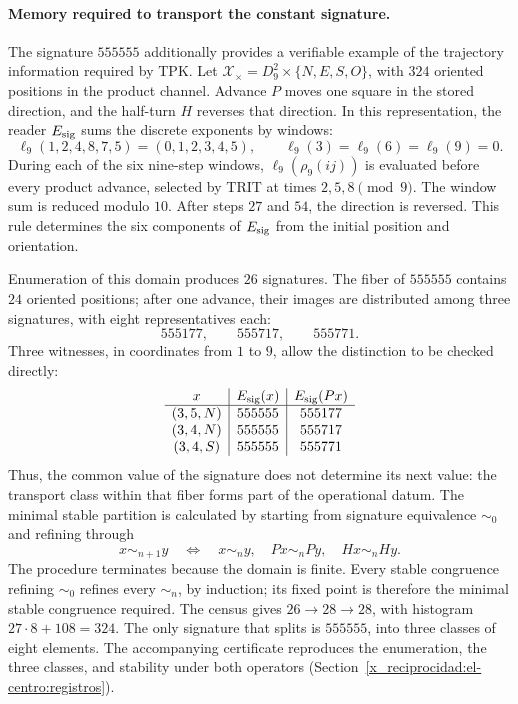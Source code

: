 \paragraph{Memory required to transport the constant signature.}
The signature \(555555\) additionally provides a verifiable example of
the trajectory information required by TPK. Let
\(\mathcal X_\times=D_9^2\times\{N,E,S,O\}\), with \(324\)
oriented positions in the product channel. Advance \(P\) moves
one square in the stored direction, and the half-turn \(H\)
reverses that direction. In this representation, the reader
\(E_{\rm sig}\) sums the discrete exponents by windows:
\[
 \ell_9(1,2,4,8,7,5)=(0,1,2,3,4,5),\qquad
 \ell_9(3)=\ell_9(6)=\ell_9(9)=0.
\]
During each of the six nine-step windows,
\(\ell_9(\rho_9(ij))\) is evaluated before every product advance, selected
by TRIT at times \(2,5,8\pmod9\). The window sum is
reduced modulo \(10\). After steps \(27\) and \(54\), the
direction is reversed. This rule determines the six components of
\(E_{\rm sig}\) from the initial position and orientation.

Enumeration of this domain produces \(26\) signatures. The fiber of
\(555555\) contains \(24\) oriented positions; after one
advance, their images are distributed among three signatures, with eight
representatives each:
\[
 555177,\qquad555717,\qquad555771.
\]
Three witnesses, in coordinates from \(1\) to \(9\), allow the
distinction to be checked directly:
\[
\begin{array}{c|c|c}
x&E_{\rm sig}(x)&E_{\rm sig}(Px)\\\hline
(3,5,N)&555555&555177\\
(3,4,N)&555555&555717\\
(3,4,S)&555555&555771
\end{array}
\]
Thus, the common value of the signature does not determine its next value:
the transport class within that fiber forms part of the operational
datum. The minimal stable partition is calculated by starting from
signature equivalence \(\sim_0\) and refining through
\[
 x\sim_{n+1}y\quad\Longleftrightarrow\quad
 x\sim_n y,\quad Px\sim_n Py,\quad Hx\sim_n Hy.
\]
The procedure terminates because the domain is finite. Every stable
congruence refining \(\sim_0\) refines every \(\sim_n\), by induction;
its fixed point is therefore the minimal stable congruence required.
The census gives \(26\to28\to28\), with histogram
\(27\cdot8+108=324\). The only signature that splits is
\(555555\), into three classes of eight elements. The accompanying certificate
reproduces the enumeration, the three classes, and stability under both
operators (Section~\ref{x_reciprocidad:el-centro:registros}).

